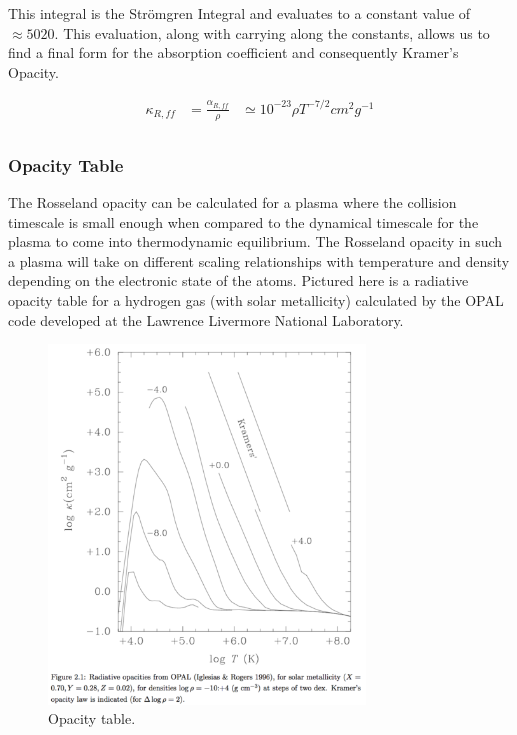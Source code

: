 \documentclass{article}
\begin{document}
This integral is the Str{\"o}mgren Integral and evaluates to a constant value of $\approx 5020$. This evaluation, along with carrying along the constants, allows us to find a final form for the absorption coefficient and consequently Kramer's Opacity.

$$
\begin{aligned}
\kappa_{R,ff} &= \frac{\alpha_{R,ff}}{\rho} &\simeq 10^{-23} \rho T^{-7/2} cm^2 g^{-1} \\
\end{aligned}
$$

\subsubsection{Opacity Table}

The Rosseland opacity can be calculated for a plasma where the collision timescale is small enough when compared to the dynamical timescale for the plasma to come into thermodynamic equilibrium. The Rosseland opacity in such a plasma will take on different scaling relationships with temperature and density depending on the electronic state of the atoms. Pictured here is a radiative opacity table for a hydrogen gas (with solar metallicity) calculated by the OPAL code developed at the Lawrence Livermore National Laboratory.

\begin{figure}
    \centering
    \includegraphics[width=0.75\textwidth]{500px-Opacity_table.png}
    \caption{Opacity table.}
    \label{fig:opTable}
\end{figure}
\end{document}
